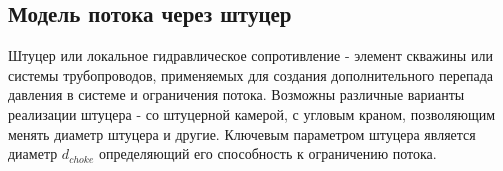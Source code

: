 \subsection{Модель потока через штуцер}


Штуцер или локальное гидравлическое сопротивление - элемент скважины или системы трубопроводов, применяемых для создания дополнительного перепада давления в системе и ограничения потока. 
Возможны различные варианты реализации штуцера - со штуцерной камерой, с угловым краном, позволяющим менять диаметр штуцера и другие.
Ключевым параметром штуцера является диаметр \(d_{choke} \) определяющий его способность к ограничению потока. 




